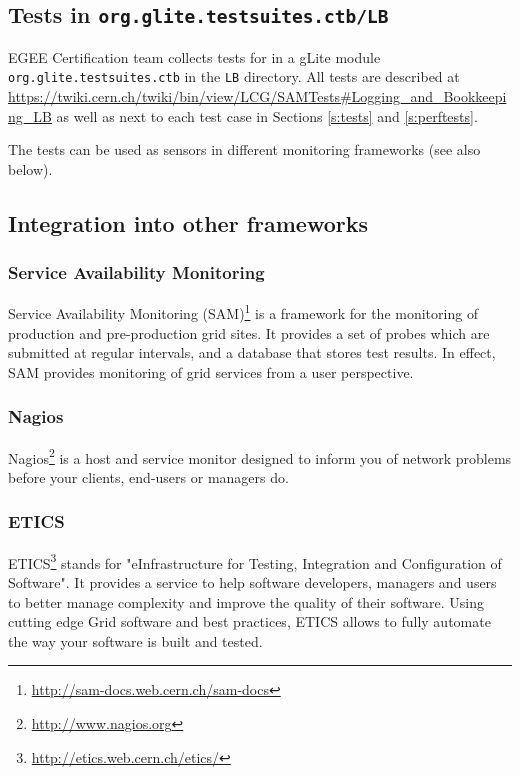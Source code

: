 \subsection{Tests in \texttt{org.glite.testsuites.ctb/LB}}

EGEE Certification team collects tests for \LB in a gLite module
\verb'org.glite.testsuites.ctb' in the \verb'LB' directory. All \LB tests are
described at
\url{https://twiki.cern.ch/twiki/bin/view/LCG/SAMTests#Logging_and_Bookkeeping_LB}
as well as next to each test case in Sections \ref{s:tests} and \ref{s:perftests}.

The tests can be used as sensors in different monitoring frameworks 
(see also below).




\subsection{Integration into other frameworks}

\subsubsection{Service Availability Monitoring}

Service Availability Monitoring
(SAM)\footnote{\url{http://sam-docs.web.cern.ch/sam-docs}} is a framework for
the monitoring of production and pre-production grid sites. It provides a set
of probes which are submitted at regular intervals, and a database that stores
test results. In effect, SAM provides monitoring of grid services from a user
perspective. 



\subsubsection{Nagios} 

Nagios\footnote{\url{http://www.nagios.org}} is a host and service monitor
designed to inform you of network problems before your clients, end-users or
managers do.



\subsubsection{ETICS}

ETICS\footnote{\url{http://etics.web.cern.ch/etics/}} stands for
"eInfrastructure for Testing, Integration and Configuration of Software". It
provides a service to help software developers, managers and users to better
manage complexity and improve the quality of their software. Using cutting
edge Grid software and best practices, ETICS allows to fully automate
the way your software is built and tested.

